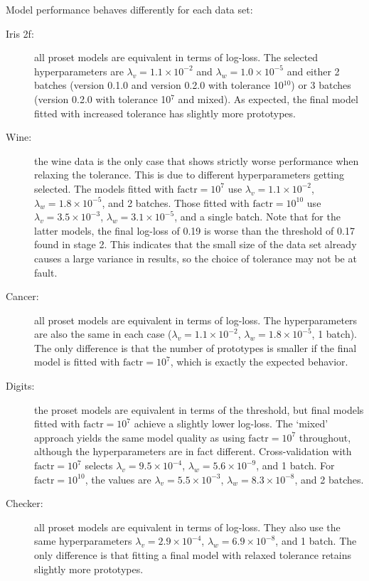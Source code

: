 %
Model performance behaves differently for each data set:
%
\begin{description}
\item[Iris 2f:] all proset models are equivalent in terms of log-loss.
The selected hyperparameters are $\lambda_v=1.1\times10^{-2}$ and $\lambda_w=1.0\times10^{-5}$ and either 2 batches (version 0.1.0 and version 0.2.0 with tolerance 10$^{10}$) or 3 batches (version 0.2.0 with tolerance 10$^7$ and mixed).
As expected, the final model fitted with increased tolerance has slightly more prototypes.
%
\item[Wine:] the wine data is the only case that shows strictly worse performance when relaxing the tolerance.
This is due to different hyperparameters getting selected.
The models fitted with $\text{factr}=10^7$ use $\lambda_v=1.1\times10^{-2}$, $\lambda_w=1.8\times10^{-5}$, and 2 batches.
Those fitted with $\text{factr}=10^{10}$ use $\lambda_v=3.5\times10^{-3}$, $\lambda_w=3.1\times10^{-5}$, and a single batch.
Note that for the latter models, the final log-loss of 0.19 is worse than the threshold of 0.17 found in stage 2.
This indicates that the small size of the data set already causes a large variance in results, so the choice of tolerance may not be at fault.
%
\item[Cancer:] all proset models are equivalent in terms of log-loss.
The hyperparameters are also the same in each case ($\lambda_v=1.1\times10^{-2}$, $\lambda_w=1.8\times10^{-5}$, 1 batch).
The only difference is that the number of prototypes is smaller if the final model is fitted with $\text{factr}=10^7$, which is exactly the expected behavior.
%
\item[Digits:] the proset models are equivalent in terms of the threshold, but final models fitted with $\text{factr}=10^7$ achieve a slightly lower log-loss.
The `mixed' approach yields the same model quality as using $\text{factr}=10^7$ throughout, although the hyperparameters are in fact different.
Cross-validation with $\text{factr}=10^7$ selects $\lambda_v=9.5\times10^{-4}$, $\lambda_w=5.6\times10^{-9}$, and 1 batch.
For $\text{factr}=10^{10}$, the values are $\lambda_v=5.5\times10^{-3}$, $\lambda_w=8.3\times10^{-8}$, and 2 batches.
%
\item[Checker:] all proset models are equivalent in terms of log-loss.
They also use the same hyperparameters $\lambda_v=2.9\times10^{-4}$, $\lambda_w=6.9\times10^{-8}$, and 1 batch.
The only difference is that fitting a final model with relaxed tolerance retains slightly more prototypes.
\end{description}
